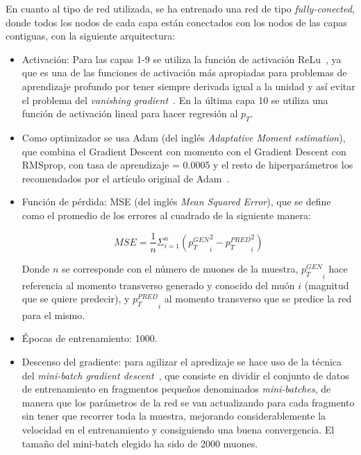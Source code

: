 En cuanto al tipo de red utilizada, se ha entrenado una red de tipo \textit{fully-conected}, donde todos los nodos de cada capa est\'an conectados con los nodos de las capas contiguas, con la siguiente arquitectura:


\begin{itemize}

\item Activaci\'on: Para las capas 1-9 se utiliza la funci\'on de activaci\'on ReLu~\cite{agarap2018deep}, ya que es una de las funciones de activaci\'on m\'as apropiadas para problemas de aprendizaje profundo por tener siempre derivada igual a la unidad y as\'i evitar el problema del \textit{vanishing gradient}~\cite{Hochreiter:91}. En la \'ultima capa 10 se utiliza una funci\'on de activaci\'on lineal para hacer regresi\'on al $p_{T}$.

\item Como optimizador se usa Adam (del ingl\'es \textit{Adaptative Moment estimation}), que combina el Gradient Descent con momento con el Gradient Descent con RMSprop, con tasa de aprendizaje = 0.0005 y el resto de hiperpar\'ametros los recomendados por el art\'iculo original de Adam~\cite{Kingma2015AdamAM}.

\item Funci\'on de p\'erdida: MSE (del ingl\'es \textit{Mean Squared Error}), que se define como el promedio de los errores al cuadrado de la siguiente manera:

\begin{equation}
  MSE = \frac{1}{n}\Sigma_{i=1}^{n}{\left({p_{T}^{GEN}}_i^2 - {p_{T}^{PRED}}_i^2\right)}
\label{eq:MSE}
\end{equation}

Donde $n$ se corresponde con el n\'umero de muones de la muestra, ${p_{T}^{GEN}}_i$ hace referencia al momento transverso generado y conocido del mu\'on $i$ (magnitud que se quiere predecir), y ${p_{T}^{PRED}}_i$ al momento transverso que se predice la red para el mismo. 

\item \'Epocas de entrenamiento: 1000.

\item Descenso del gradiente: para agilizar el apredizaje se hace uso de la t\'ecnica del \textit{mini-batch gradient descent}~\cite{perrone2019optimal}, que consiste en dividir el conjunto de datos de entrenamiento en fragmentos peque\~nos denominados \textit{mini-batches}, de manera que los par\'ametros de la red se van actualizando para cada fragmento sin tener que recorrer toda la muestra, mejorando considerablemente la velocidad en el entrenamiento y consiguiendo una buena convergencia. El tama\~no del mini-batch elegido ha sido de 2000 muones.


\end{itemize}
